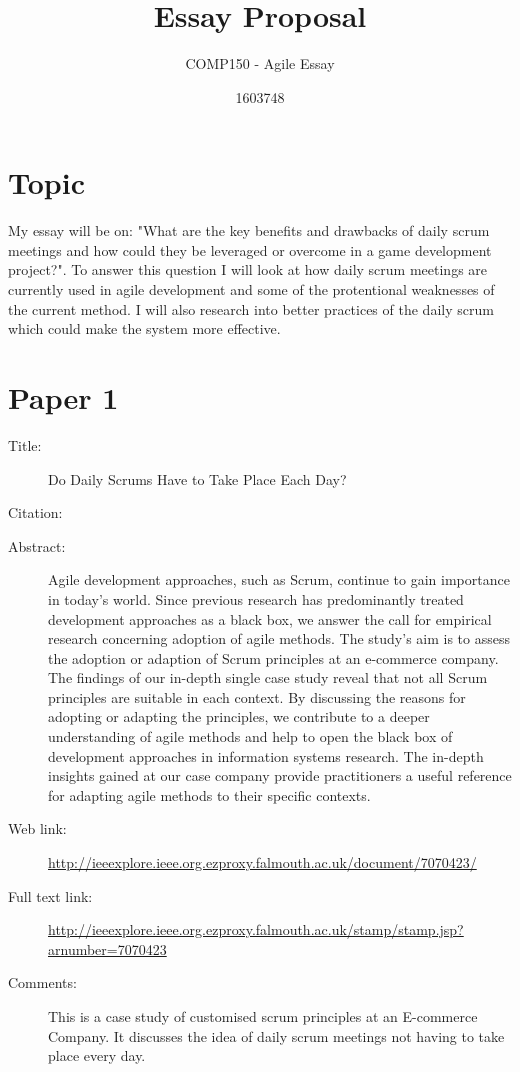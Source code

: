 \documentclass{scrartcl}
\title{Essay Proposal}
\subtitle{COMP150 - Agile Essay}
\author{1603748}
\begin{document}
\maketitle

\section*{Topic}

My essay will be on: "What are the key benefits and drawbacks of daily scrum meetings and how could they be leveraged or overcome in a game development project?". To answer this question I will look at how daily scrum meetings are currently used in agile development and some of the protentional weaknesses of the current method. I will also research into better practices of the daily scrum which could make the system more effective.


\section*{Paper 1}
\begin{description}
\item[Title:] Do Daily Scrums Have to Take Place Each Day?
\item[Citation:] \cite{ScrumEveryDay}
\item[Abstract:] Agile development approaches, such as Scrum, continue to gain importance in today's world. Since previous research has predominantly treated development approaches as a black box, we answer the call for empirical research concerning adoption of agile methods. The study's aim is to assess the adoption or adaption of Scrum principles at an e-commerce company. The findings of our in-depth single case study reveal that not all Scrum principles are suitable in each context. By discussing the reasons for adopting or adapting the principles, we contribute to a deeper understanding of agile methods and help to open the black box of development approaches in information systems research. The in-depth insights gained at our case company provide practitioners a useful reference for adapting agile methods to their specific contexts.
\item[Web link:] \url{http://ieeexplore.ieee.org.ezproxy.falmouth.ac.uk/document/7070423/}
\item[Full text link:] \url{http://ieeexplore.ieee.org.ezproxy.falmouth.ac.uk/stamp/stamp.jsp?arnumber=7070423}
\item[Comments:] This is a case study of customised scrum principles at an E-commerce Company. It discusses the idea of daily scrum meetings not having to take place every day. 
\end{description}
\end{document}
